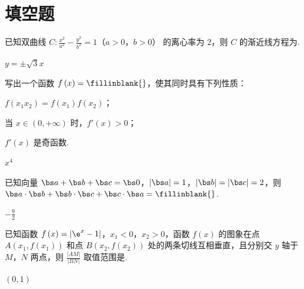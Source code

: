 \section{填空题}

\begin{problem}
已知双曲线 \(C:\frac{x^2}{a^2}-\frac{y^2}{b^2}=1\)（\(a>0\)，\(b>0\)） 的离心率为 \(2\)，则 \(C\) 的渐近线方程为\fillinblank{}.

\begin{answer}
\(y=\pm\sqrt3x\)
\end{answer}
\end{problem}


\begin{problem}
写出一个函数 \(f\left( x \right)=\fillinblank{}\)，使其同时具有下列性质：

\begin{circlelist}
\item \(f\left( x_1x_2 \right)=f\left( x_1 \right)f\left( x_2 \right)\)；
\item 当 \(x\in \left( 0,+\infty \right)\) 时，\(f'\left( x \right)>0\)；
\item \(f'\left( x \right)\) 是奇函数.
\end{circlelist}

\begin{answer}
\(x^4\)
\end{answer}
\end{problem}


\begin{problem}
已知向量 \(\bs a+\bs b+\bs c=\bs 0\)，\(\left| \bs a \right|=1\)，\(\left| \bs b \right|=\left| \bs c \right|=2\)，则 \(\bs a\cdot \bs b+\bs b\cdot \bs c+\bs c\cdot \bs a=\fillinblank{}\).

\begin{answer}
\(-\frac{9}{2}\)
\end{answer}
\end{problem}


\begin{problem}
已知函数 \(f\left( x \right)=\left| \e^x-1 \right|\)，\(x_1<0\)，\(x_2>0\)，函数 \(f\left( x \right)\) 的图象在点 \(A\left( x_1,f\left( x_1 \right) \right)\) 和点 \(B\left( x_2,f\left( x_2 \right) \right)\) 处的两条切线互相垂直，且分别交 \(y\) 轴于 \(M\)，\(N\) 两点，则 \(\frac{\left| AM \right|}{\left| BN \right|}\) 取值范围是\fillinblank{}.

\begin{answer}
\((0,1)\)
\end{answer}
\end{problem}

